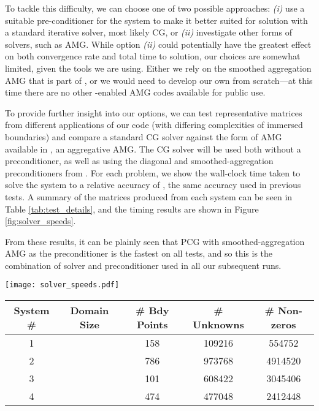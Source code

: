 To tackle this difficulty, we can choose one of two possible approaches: \emph{(i)} use a suitable pre-conditioner for the system to make it better suited for solution with a standard iterative solver, most likely CG, or \emph{(ii)} investigate other forms of solvers, such as AMG.
While option \emph{(ii)} could potentially have the greatest effect on both convergence rate and total time to solution, our choices are somewhat limited, given the tools we are using. Either we rely on the smoothed aggregation AMG that is part of {\cusp}, or we would need to develop our own from scratch---at this time there are no other \gpu-enabled AMG codes available for public use. 

To provide further insight into our options, we can test representative matrices from different applications of our code (with differing complexities of immersed boundaries) and compare a standard CG solver against the form of AMG available in {\cusp}, an aggregative AMG. The CG solver will be used both without a preconditioner, as well as using the diagonal and smoothed-aggregation preconditioners from {\cusp}. For each problem, we show the wall-clock time taken to solve the system to a relative accuracy of , the same accuracy used in previous tests. A summary of the matrices produced from each system can be seen in Table \ref{tab:test_details}, and the timing results are shown in Figure \ref{fig:solver_speeds}.

From these results, it can be plainly seen that PCG with smoothed-aggregation AMG as the preconditioner is the fastest on all tests, and so this is the combination of solver and preconditioner used in all our subsequent runs.

\begin{figure*}\centering
	\texttt{[image: solver\_speeds.pdf]}
	\caption{\small Comparison of {\gpu} solvers on real test problems - Conjugate Gradient, Preconditioned Conjugate Gradient with diagonal and Smoothed Aggregation preconditioners, and a full solve using Smoothed Aggregation}
	\label{fig:solver_speeds}
\label{fig:solver_speeds}
\end{figure*}

\begin{table*}
\begin{center}
\small
	\begin{tabular}{| c | c | c | c | c | }
	\hline
		System \# & Domain Size & \# Bdy Points & \# Unknowns & \# Non-zeros \\
	\hline
		1 &  & 158 & 109216 & 554752 \\
		2 &  & 786 & 973768 & 4914520 \\
		3 &  & 101 & 608422 & 3045406 \\
		4 &  & 474 & 477048 & 2412448 \\
	\hline
	\end{tabular}
	\caption{\small Systems  and  correspond to flow over a cylinder at  and  respectively, system  is for a flapping-wing calculation, and system  is from a synthetic test with  moving cylinders.}
	\label{tab:test_details}
\end{center}
\end{table*}

